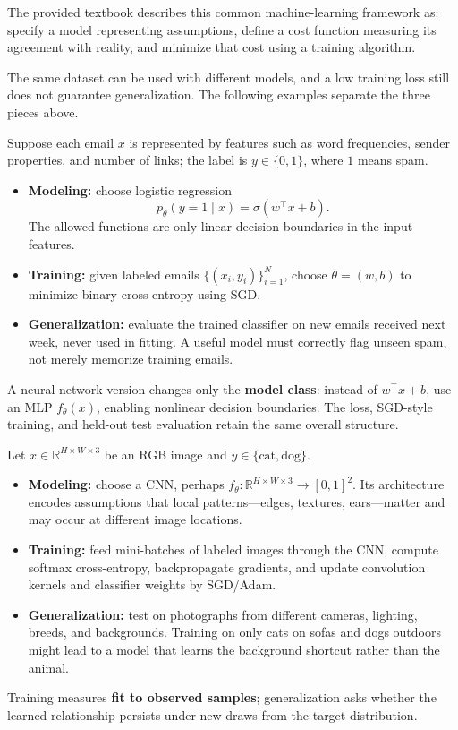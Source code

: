 \documentclass[11pt,a4paper]{article}
\theoremstyle{definition}
\begin{document}
  The provided textbook describes this common machine-learning framework as: specify a model representing assumptions, define a cost function measuring its agreement with reality, and minimize that cost using a training algorithm.

  The same dataset can be used with different models, and a low training loss still does not guarantee generalization. The following examples separate the three pieces above.

\begin{example}
Suppose each email $x$ is represented by features such as word frequencies, sender properties, and number of links; the label is $y\in\{0,1\}$, where $1$ means spam.
\begin{itemize}
  \item \textbf{Modeling:} choose logistic regression
  \[
  p_\theta(y=1\mid x)=\sigma(w^\top x+b).
  \]
  The allowed functions are only linear decision boundaries in the input features.
  \item \textbf{Training:} given labeled emails $\{(x_i,y_i)\}_{i=1}^N$, choose $\theta=(w,b)$ to minimize binary cross-entropy using SGD.
  \item \textbf{Generalization:} evaluate the trained classifier on new emails received next week, never used in fitting. A useful model must correctly flag unseen spam, not merely memorize training emails.
\end{itemize}
A neural-network version changes only the \textbf{model class}: instead of $w^\top x+b$, use an MLP $f_\theta(x)$, enabling nonlinear decision boundaries. The loss, SGD-style training, and held-out test evaluation retain the same overall structure.
\end{example}

\begin{example}
Let $x\in\mathbb{R}^{H\times W\times 3}$ be an RGB image and $y\in\{\text{cat},\text{dog}\}$.
\begin{itemize}
  \item \textbf{Modeling:} choose a CNN, perhaps $f_\theta:\mathbb{R}^{H\times W\times 3}\to[0,1]^2$. Its architecture encodes assumptions that local patterns---edges, textures, ears---matter and may occur at different image locations.
  \item \textbf{Training:} feed mini-batches of labeled images through the CNN, compute softmax cross-entropy, backpropagate gradients, and update convolution kernels and classifier weights by SGD/Adam.
  \item \textbf{Generalization:} test on photographs from different cameras, lighting, breeds, and backgrounds. Training on only cats on sofas and dogs outdoors might lead to a model that learns the background shortcut rather than the animal.
\end{itemize}
Training measures \textbf{fit to observed samples}; generalization asks whether the learned relationship persists under new draws from the target distribution.
\end{example}
\end{document}
